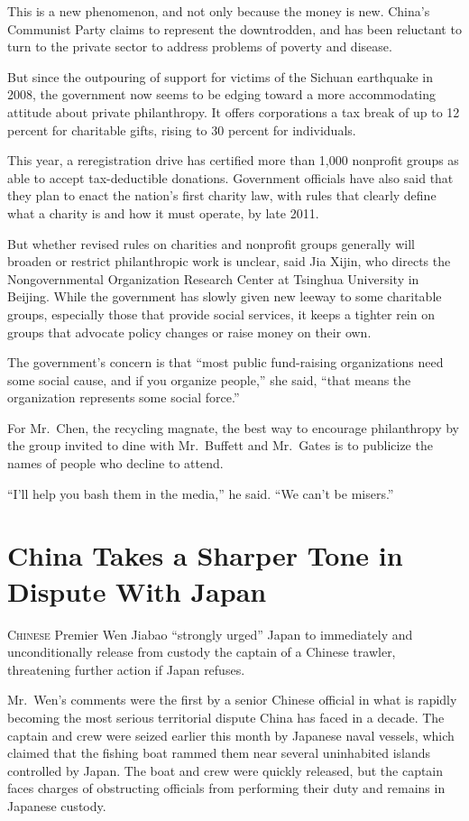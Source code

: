 ﻿\documentclass[12pt]{article}
\begin{document}
This is a new phenomenon, and not only because the money is new. China's Communist Party claims to
represent the downtrodden, and has been reluctant to turn to the private sector to address problems
of poverty and disease.

But since the outpouring of support for victims of the Sichuan earthquake in 2008, the government
now seems to be edging toward a more accommodating attitude about private philanthropy. It offers
corporations a tax break of up to 12 percent for charitable gifts, rising to 30 percent for
individuals.

This year, a reregistration drive has certified more than 1,000 nonprofit groups as able to accept
tax-deductible donations. Government officials have also said that they plan to enact the nation's
first charity law, with rules that clearly define what a charity is and how it must operate, by late
2011.

But whether revised rules on charities and nonprofit groups generally will broaden or restrict
philanthropic work is unclear, said Jia Xijin, who directs the Nongovernmental Organization Research
Center at Tsinghua University in Beijing. While the government has slowly given new leeway to some
charitable groups, especially those that provide social services, it keeps a tighter rein on groups
that advocate policy changes or raise money on their own.

The government's concern is that ``most public fund-raising organizations need some social cause,
and if you organize people,'' she said, ``that means the organization represents some social
force.''

For Mr.~Chen, the recycling magnate, the best way to encourage philanthropy by the group invited to
dine with Mr.~Buffett and Mr.~Gates is to publicize the names of people who decline to attend.

``I'll help you bash them in the media,'' he said. ``We can't be misers.''

\pagebreak
\section{China Takes a Sharper Tone in Dispute With Japan}

\lettrine{C}{hinese} Premier Wen Jiabao ``strongly urged'' Japan to
immediately and unconditionally release from custody the captain of a Chinese trawler, threatening
further action if Japan refuses.

Mr.~Wen's comments were the first by a senior Chinese official in what is rapidly becoming the most
serious territorial dispute China has faced in a decade. The captain and crew were seized earlier
this month by Japanese naval vessels, which claimed that the fishing boat rammed them near several
uninhabited islands controlled by Japan. The boat and crew were quickly released, but the captain
faces charges of obstructing officials from performing their duty and remains in Japanese custody.
\end{document}
